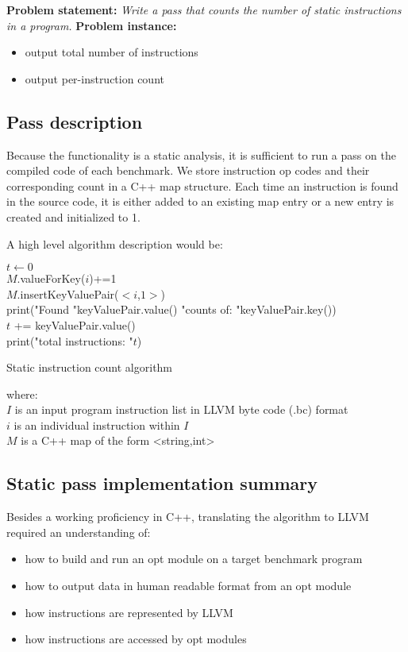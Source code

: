 
\textbf{Problem statement: }\textit{Write a pass that counts the number of static instructions in a program.}
\textbf{Problem instance:}
\begin{itemize}
\item output total number of instructions
\item output per-instruction count
\end{itemize}

\subsection{Pass description}

Because the functionality is a static analysis, it is sufficient to run a pass on the compiled code of each benchmark.
We store instruction op codes and their corresponding count in a C++ map structure. Each time an instruction is found in the source code, it is either added to an existing map entry or a new entry is created and initialized to 1.

A high level algorithm description would be:\\

\begin{algorithm}
 $t \gets 0$\\
 { 
 	{
 		$M$.valueForKey($i$)+=1\\
 	}
 	\Else
 	{
 		$M$.insertKeyValuePair($<i$,$1>$)\\
 	}
 }
 {
 	print("Found "keyValuePair.value() "counts of: "keyValuePair.key())\\
 	$t$ += keyValuePair.value()\\
 }
 print("total instructions: "$t$)
 \caption{Static instruction count algorithm}
\end{algorithm}
where:\\
$I$ is an input program instruction list in LLVM byte code (.bc) format\\
$i$ is an individual instruction within $I$\\
$M$ is a C++ map of the form <string,int>

\subsection{Static pass implementation summary}
Besides a working proficiency in C++, translating the algorithm to LLVM required an understanding of:
\begin{itemize}
\item how to build and run an opt module on a target benchmark program
\item how to output data in human readable format from an opt module
\item how instructions are represented by LLVM
\item how instructions are accessed by opt modules
\end{itemize}

